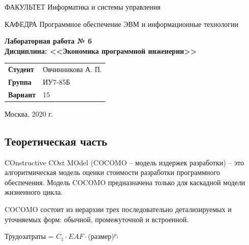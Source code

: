 \documentclass[a4paper,14pt]{article}
\begin{document}
\begin{titlepage}
    \begin{flushleft}
        ФАКУЛЬТЕТ Информатика и системы управления
    \end{flushleft}
    КАФЕДРА Программное обеспечение ЭВМ и информационные технологии

    \vspace{3cm}

    \begin{center}
        \textbf{Лабораторная работа № 6} \\
        \textbf{Дисциплина: <<Экономика программной инженерии>>}
        \vspace{0.5cm}
    \end{center}


    \vspace{3cm}

    \begin{flushleft}
        \begin{tabular}{ll}
            \textbf{Студент}       & Овчинникова А. П. \\
            \textbf{Группа}        & ИУ7-85Б           \\
            \textbf{Вариант}       & 15           \\
        \end{tabular}
    \end{flushleft}

    \vspace{3cm}

    \begin{center}
        Москва, 2020 г.
    \end{center}

\end{titlepage}

\setcounter{page}{2}

\subsection*{Теоретическая часть}

COnstructive COst MOdel (COCOMO – модель издержек разработки) – это алгоритмическая модель оценки стоимости разработки программного обеспечения.  Модель  COCOMO  предназначена  только  для  каскадной модели жизненного цикла.

COCOMO состоит из иерархии трех последовательно детализируемых и уточняемых форм: обычной, промежуточной и встроенной.

Трудозатраты = $C_1 \cdot EAF \cdot$(размер)$^{p_1}$
\end{document}

